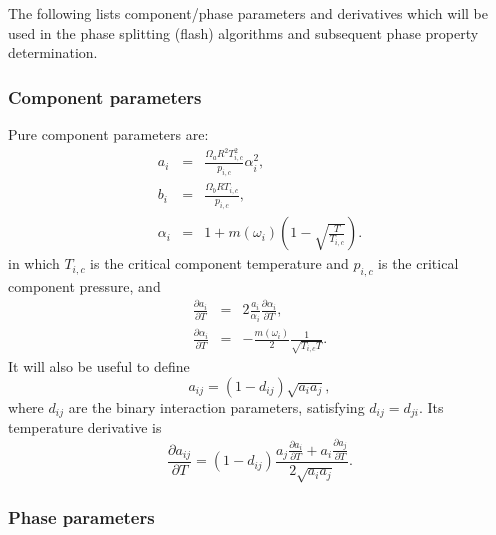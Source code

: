 
The following lists component/phase parameters and derivatives which
will be used in the phase splitting (flash) algorithms and subsequent
phase property determination.


\subsubsection{Component parameters}

Pure component parameters are:
\begin{eqnarray}
  a_i & = & \frac{\Omega_a R^2 T_{i,c}^2}{p_{i,c}} \alpha_i^2, \\
  b_i & = & \frac{\Omega_b  R T_{i,c}}{p_{i,c}}, \\
  \alpha_i & = & 1 + m(\omega_i) \left(
    1 - \sqrt{\frac{T}{T_{i,c}}}\right).
\end{eqnarray}
in which $T_{i,c}$ is the critical component temperature and $p_{i,c}$
is the critical component pressure, and
\begin{eqnarray}
  \frac{\partial a_i}{\partial T} & = &
  2\frac{a_i}{\alpha_i} \frac{\partial\alpha_i}{\partial T}, \\
  \frac{\partial\alpha_i}{\partial T} & = &
  -\frac{m(\omega_i)}{2}\frac{1}{\sqrt{T_{i,c} T}}.
\end{eqnarray}
It will also be useful to define
\begin{equation}
  a_{ij} = \left( 1 - d_{ij}\right) \sqrt{a_i a_j},
\end{equation}
where $d_{ij}$ are the binary interaction parameters, satisfying
$d_{ij}=d_{ji}$. Its temperature derivative is
\begin{equation}
  \frac{\partial a_{ij}}{\partial T} =
  \left(
    1 - d_{ij}\right) \frac{a_j \frac{\partial a_i}{\partial T} +
    a_i \frac{\partial a_j}{\partial T}}{2\sqrt{a_i a_j}}.
\end{equation}


\subsubsection{Phase parameters}

